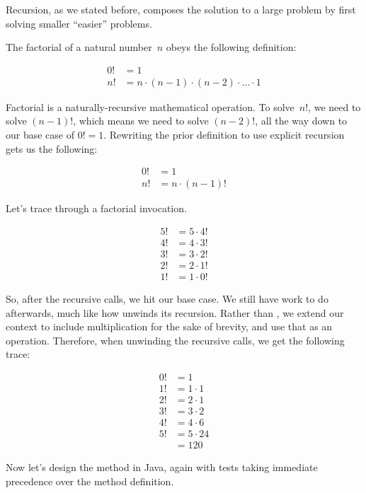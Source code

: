 Recursion, as we stated before, composes the solution to a large problem by first solving smaller ``easier'' problems.

The factorial of a natural number~$n$ obeys the following definition:

\begin{align*}
    0! &= 1\\
    n! &= n \cdot (n - 1) \cdot (n - 2) \cdot \ldots \cdot 1
\end{align*}

Factorial is a naturally-recursive mathematical operation. 
To solve~$n!$, we need to solve $(n-1)!$, which means we need to solve $(n-2)!$, all the way down to our base case of $0!=1$. 
Rewriting the prior definition to use explicit recursion gets us the following: \

\begin{align*}
    0! &= 1\\
    n! &= n \cdot (n - 1)!
\end{align*}

Let's trace through a factorial invocation.

\begin{align*}
    5! &= 5 \cdot 4!\\
    4! &= 4 \cdot 3!\\
    3! &= 3 \cdot 2!\\
    2! &= 2 \cdot 1!\\
    1! &= 1 \cdot 0!
\end{align*}

So, after the recursive calls, we hit our base case. 
We still have work to do afterwards, much like how  unwinds its recursion. 
Rather than , we extend our context to include multiplication for the sake of brevity, and use that as an operation. 
Therefore, when unwinding the recursive calls, we get the following trace:

\begin{align*}
0! &= 1\\
1! &= 1 \cdot 1\\
2! &= 2 \cdot 1\\
3! &= 3 \cdot 2\\
4! &= 4 \cdot 6\\
5! &= 5 \cdot 24\\
   &= 120
\end{align*}

Now let's design the  method in Java, again with tests taking immediate precedence over the method definition.

